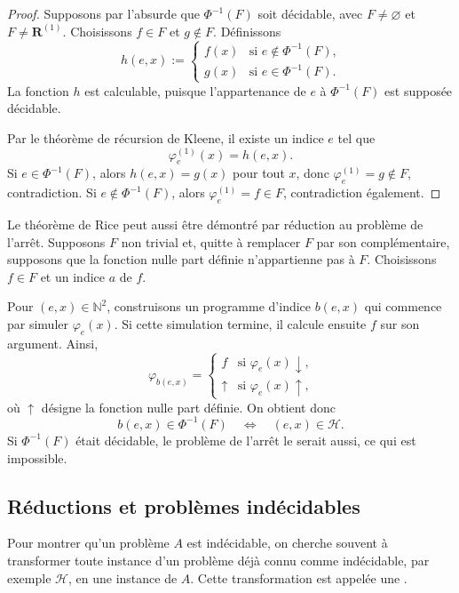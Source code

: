 \begin{proof}
Supposons par l'absurde que $\Phi^{-1}(F)$ soit décidable, avec
$F\neq\varnothing$ et $F\neq\mathbf{R}^{(1)}$.  Choisissons
$f\in F$ et $g\notin F$.  Définissons
\[
h(e,x):=
\begin{cases}
f(x)&\text{si $e\notin\Phi^{-1}(F)$,}\\
g(x)&\text{si $e\in\Phi^{-1}(F)$.}
\end{cases}
\]
La fonction $h$ est calculable, puisque l'appartenance de $e$ à
$\Phi^{-1}(F)$ est supposée décidable.

Par le théorème de récursion de Kleene, il existe un indice $e$ tel
que
\[
\varphi_e^{(1)}(x)=h(e,x).
\]
Si $e\in\Phi^{-1}(F)$, alors $h(e,x)=g(x)$ pour tout $x$, donc
$\varphi_e^{(1)}=g\notin F$, contradiction.  Si
$e\notin\Phi^{-1}(F)$, alors $\varphi_e^{(1)}=f\in F$, contradiction
également.
\end{proof}

\thingy Le théorème de Rice peut aussi être démontré par réduction au
problème de l'arrêt.  Supposons $F$ non trivial et, quitte à remplacer
$F$ par son complémentaire, supposons que la fonction nulle part
définie n'appartienne pas à $F$.  Choisissons $f\in F$ et un indice
$a$ de $f$.

Pour $(e,x)\in\mathbb{N}^2$, construisons un programme d'indice
$b(e,x)$ qui commence par simuler $\varphi_e(x)$.  Si cette simulation
termine, il calcule ensuite $f$ sur son argument.  Ainsi,
\[
\varphi_{b(e,x)}=
\begin{cases}
f&\text{si $\varphi_e(x)\downarrow$,}\\
{\uparrow}&\text{si $\varphi_e(x)\uparrow$,}
\end{cases}
\]
où ${\uparrow}$ désigne la fonction nulle part définie.  On obtient
donc
\[
b(e,x)\in\Phi^{-1}(F)
\quad\Longleftrightarrow\quad
(e,x)\in\mathscr{H}.
\]
Si $\Phi^{-1}(F)$ était décidable, le problème de l'arrêt le serait
aussi, ce qui est impossible.

\subsection{Réductions et problèmes indécidables}
\label{subsection-reductions}

\thingy Pour montrer qu'un problème $A$ est indécidable, on cherche
souvent à transformer toute instance d'un problème déjà connu comme
indécidable, par exemple $\mathscr{H}$, en une instance de $A$.  Cette
transformation est appelée une .

